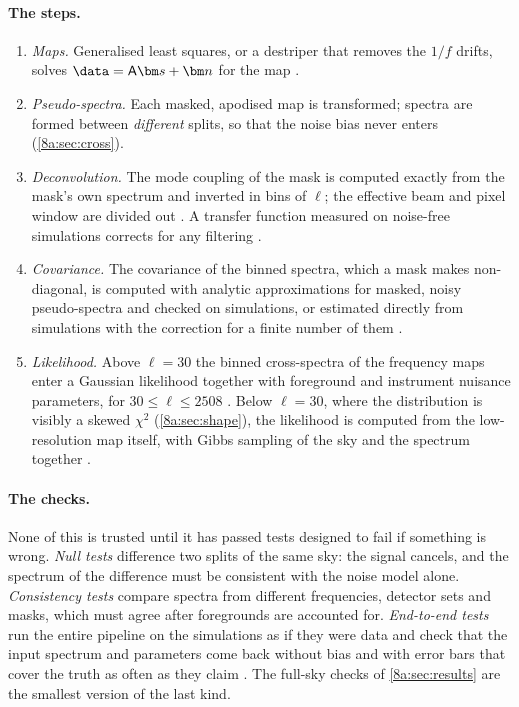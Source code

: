 \paragraph{The steps.}
\begin{enumerate}
  \item \emph{Maps.} Generalised least squares, or a destriper that removes the $1/f$ drifts,
        solves $\data=\mathsf A\bm s+\bm n$ for the map .
  \item \emph{Pseudo-spectra.} Each masked, apodised map is transformed; spectra are formed
        between \emph{different} splits, so that the noise bias never enters
        (\cref{8a:sec:cross}).
  \item \emph{Deconvolution.} The mode coupling of the mask is computed exactly from the
        mask's own spectrum and inverted in bins of $\ell$; the effective beam and pixel window
        are divided out . A transfer function measured on noise-free
        simulations corrects for any filtering .
  \item \emph{Covariance.} The covariance of the binned spectra, which a mask makes
        non-diagonal, is computed with analytic approximations for masked, noisy pseudo-spectra
        and checked on simulations, or estimated directly from simulations with the correction
        for a finite number of them \cite{Hartlap2007}.
  \item \emph{Likelihood.} Above $\ell=30$ the binned cross-spectra of the frequency maps
        enter a Gaussian likelihood together with foreground and instrument nuisance
        parameters, for $30\le\ell\le2508$ \cite{Planck2018V}. Below $\ell=30$, where the
        distribution is visibly a skewed $\chi^2$ (\cref{8a:sec:shape}), the likelihood is
        computed from the low-resolution map itself, with Gibbs sampling of the sky and the
        spectrum together \cite{Planck2018V}.
\end{enumerate}

\paragraph{The checks.}
None of this is trusted until it has passed tests designed to fail if something is wrong.
\emph{Null tests} difference two splits of the same sky: the signal cancels, and the spectrum
of the difference must be consistent with the noise model alone. \emph{Consistency tests}
compare spectra from different frequencies, detector sets and masks, which must agree after
foregrounds are accounted for. \emph{End-to-end tests} run the entire pipeline on the
simulations as if they were data and check that the input spectrum and parameters come back
without bias and with error bars that cover the truth as often as they claim
\cite{Planck2018V}. The full-sky checks of \cref{8a:sec:results} are the smallest version of
the last kind.

